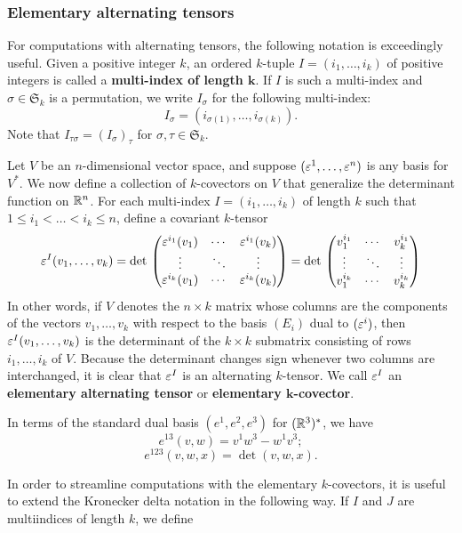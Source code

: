 \subsubsection{Elementary alternating tensors}
For computations with alternating tensors, the following notation is exceedingly useful. Given a positive integer $k$, an ordered $k$-tuple $I=(i_1,\dots,i_k)$ of positive integers is called a \textbf{multi-index of length $\bm{k}$}. If $I$ is such a multi-index and $\sigma\in\mathfrak{S}_k$ is a permutation, we write $I_\sigma$ for the following multi-index:
\[I_\sigma=(i_{\sigma(1)},\dots,i_{\sigma(k)}).\]
Note that $I_{\tau\sigma}=(I_{\sigma})_\tau$ for $\sigma,\tau\in\mathfrak{S}_k$.\par
Let $V$ be an $n$-dimensional vector space, and suppose $(\varepsilon^1,\dots,\varepsilon^n)$ is any basis for $V^*$. We now define a collection of $k$-covectors on $V$ that generalize the determinant function on $\mathbb{R}^n$. For each multi-index $I=(i_1,\dots,i_k)$ of length $k$ such that $1\leq i_1<\dots<i_k\leq n$, define a covariant $k$-tensor
\begin{align}\label{elementry alt tensor}
\varepsilon^I(v_1,\dots,v_k)=\mathrm{det}\,\begin{pmatrix}
\varepsilon^{i_1}(v_1)&\cdots&\varepsilon^{i_1}(v_k)\\
\vdots&\ddots&\vdots\\
\varepsilon^{i_k}(v_1)&\cdots&\varepsilon^{i_k}(v_k)
\end{pmatrix}=\mathrm{det}\,\begin{pmatrix}
v_1^{i_1}&\cdots&v_k^{i_1}\\
\vdots&\ddots&\vdots\\
v_1^{i_k}&\cdots&v_k^{i_k}
\end{pmatrix}
\end{align}
In other words, if $V$ denotes the $n\times k$ matrix whose columns are the components of the vectors $v_1,\dots,v_k$ with respect to the basis $(E_i)$ dual to $(\varepsilon^i)$, then $\varepsilon^I(v_1,\dots,v_k)$ is the determinant of the $k\times k$ submatrix consisting of rows $i_1,\dots,i_k$ of $V$. Because the determinant changes sign whenever two columns are interchanged, it is clear that $\varepsilon^I$ is an alternating $k$-tensor. We call $\varepsilon^I$ an \textbf{elementary alternating tensor} or \textbf{elementary $\bm{k}$-covector}.
\begin{example}
In terms of the standard dual basis $(e^1,e^2,e^3)$ for $(\mathbb{R}^3)^*$, we have
\[e^{13}(v,w)=v^1w^3-w^1v^3;\]
\[e^{123}(v,w,x)=\det(v,w,x).\]
\end{example}
In order to streamline computations with the elementary $k$-covectors, it is useful to extend the Kronecker delta notation in the following way. If $I$ and $J$ are multiindices of length $k$, we define
